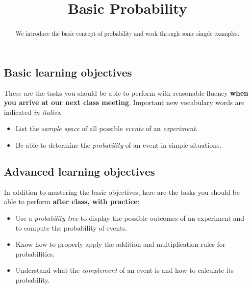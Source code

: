 \documentclass{ximera}
\title{Basic Probability}
\begin{document}
\begin{abstract}
We introduce the basic concept of probability and work through some simple examples.
\end{abstract}
\maketitle

\subsection*{Basic learning objectives}

These are the tasks you should be able to perform with reasonable fluency \textbf{when you arrive at our next class meeting}. Important new vocabulary words are indicated \emph{in italics}. 

\begin{itemize}
	\item List the \emph{sample space} of all possible \emph{events} of an \emph{experiment}.
	\item Be able to determine the \emph{probability} of an event in simple situations.
\end{itemize}

\subsection*{Advanced learning objectives}

In addition to mastering the basic objectives, here are the tasks you should be able to perform \textbf{after class, with practice}: 

\begin{itemize}
	\item Use a \emph{probability tree} to display the possible outcomes of an experiment and to compute the probability of events.
	\item Know how to properly apply the addition and multiplication rules for probabilities.
    \item Understand what the \emph{complement} of an event is and how to calculate its probability.
\end{itemize}
\end{document}
